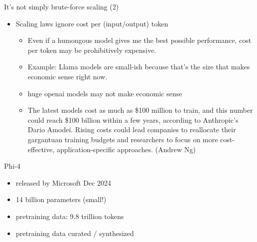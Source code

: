 \begin{vbframe}{It's not simply brute-force scaling (2)}

\vfill

\begin{itemize}
	\item Scaling laws ignore cost per (input/output) token 
	\begin{itemize}
	\item Even if a humongous model gives me the best
	possible performance, cost per token may be
	prohibitively expensive.
        \item Example: Llama models are small-ish because
	that's the size that makes economic sense right now.
        \item huge openai models may not make economic sense
        \item The
        latest models cost as much as \$100 million to train,
	and
        this number could reach \$100 billion within a few
	years,
        according to Anthropic’s Dario Amodei. Rising costs
	could
        lead companies to reallocate their gargantuan
	training
        budgets and researchers to focus on more
	cost-effective,
        application-specific approaches. (Andrew Ng)
         
	\end{itemize}

\end{itemize}

\vfill

\end{vbframe}


\begin{vbframe}{Phi-4}

\vfill

\begin{itemize}
\item released by Microsoft Dec 2024
	\item 14 billion parameters (small!)
	\item pretraining data: 9.8 trillion tokens
        \item pretraining data curated / synthesized
\end{itemize}

\vfill

\end{vbframe}


